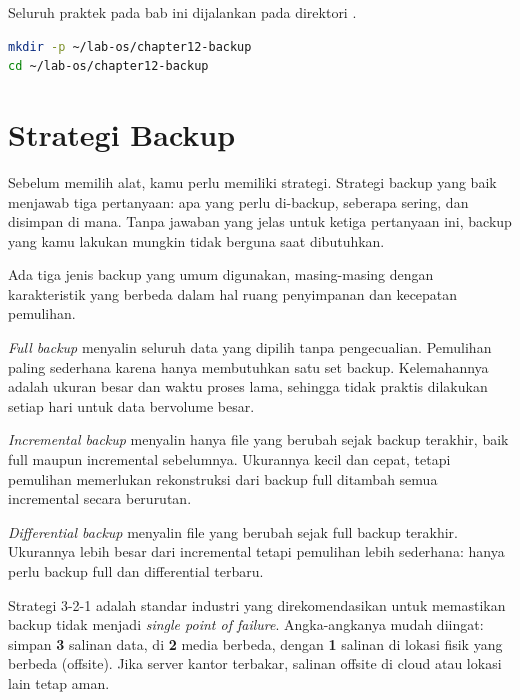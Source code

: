 \begin{notebox}
Seluruh praktek pada bab ini dijalankan pada direktori .
\begin{lstlisting}[language=bash]
mkdir -p ~/lab-os/chapter12-backup
cd ~/lab-os/chapter12-backup
\end{lstlisting}
\end{notebox}

\section{Strategi Backup}
\label{sec:backup-strategy}

Sebelum memilih alat, kamu perlu memiliki strategi. Strategi backup yang baik
menjawab tiga pertanyaan: apa yang perlu di-backup, seberapa sering, dan
disimpan di mana. Tanpa jawaban yang jelas untuk ketiga pertanyaan ini, backup
yang kamu lakukan mungkin tidak berguna saat dibutuhkan.

Ada tiga jenis backup yang umum digunakan, masing-masing dengan karakteristik
yang berbeda dalam hal ruang penyimpanan dan kecepatan pemulihan.

\emph{Full backup} menyalin seluruh data yang dipilih tanpa pengecualian.
Pemulihan paling sederhana karena hanya membutuhkan satu set backup. Kelemahannya
adalah ukuran besar dan waktu proses lama, sehingga tidak praktis dilakukan
setiap hari untuk data bervolume besar.

\emph{Incremental backup} menyalin hanya file yang berubah sejak backup
terakhir, baik full maupun incremental sebelumnya. Ukurannya kecil dan cepat,
tetapi pemulihan memerlukan rekonstruksi dari backup full ditambah semua
incremental secara berurutan.

\emph{Differential backup} menyalin file yang berubah sejak full backup
terakhir. Ukurannya lebih besar dari incremental tetapi pemulihan lebih
sederhana: hanya perlu backup full dan differential terbaru.

Strategi 3-2-1 adalah standar industri yang direkomendasikan untuk memastikan
backup tidak menjadi \emph{single point of failure}. Angka-angkanya mudah
diingat: simpan \textbf{3} salinan data, di \textbf{2} media berbeda, dengan
\textbf{1} salinan di lokasi fisik yang berbeda (offsite). Jika server kantor
terbakar, salinan offsite di cloud atau lokasi lain tetap aman.

